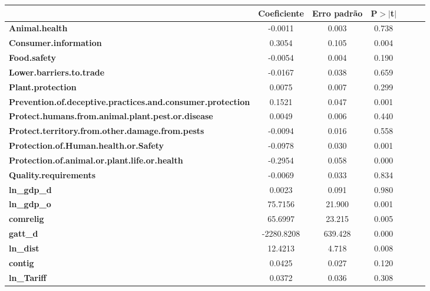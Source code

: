 \begin{center}
\begin{tabular}{lcccccc}
                                                                   & \textbf{Coeficiente} & \textbf{Erro padrão} & \textbf{P$> |$t$|$}\\
\midrule
\textbf{Animal.health}                                             &      -0.0011  &        0.003     &        0.738\\
\textbf{Consumer.information}                                      &       0.3054  &        0.105     &        0.004\\
\textbf{Food.safety}                                               &      -0.0054  &        0.004     &        0.190\\
\textbf{Lower.barriers.to.trade}                                   &      -0.0167  &        0.038     &        0.659\\
\textbf{Plant.protection}                                          &       0.0075  &        0.007     &        0.299\\
\textbf{Prevention.of.deceptive.practices.and.consumer.protection} &       0.1521  &        0.047     &        0.001\\
\textbf{Protect.humans.from.animal.plant.pest.or.disease}          &       0.0049  &        0.006     &        0.440\\
\textbf{Protect.territory.from.other.damage.from.pests}            &      -0.0094  &        0.016     &        0.558\\
\textbf{Protection.of.Human.health.or.Safety}                      &      -0.0978  &        0.030     &        0.001\\
\textbf{Protection.of.animal.or.plant.life.or.health}              &      -0.2954  &        0.058     &        0.000\\
\textbf{Quality.requirements}                                      &      -0.0069  &        0.033     &        0.834\\
\textbf{ln\_gdp\_d}                                                &       0.0023  &        0.091     &        0.980\\
\textbf{ln\_gdp\_o}                                                &      75.7156  &       21.900     &        0.001\\
\textbf{comrelig}                                                  &      65.6997  &       23.215     &        0.005\\
\textbf{gatt\_d}                                                   &   -2280.8208  &      639.428     &        0.000\\
\textbf{ln\_dist}                                                  &      12.4213  &        4.718     &        0.008\\
\textbf{contig}                                                    &       0.0425  &        0.027     &        0.120\\
\textbf{ln\_Tariff}                                                &       0.0372  &        0.036     &        0.308\\
\bottomrule
\end{tabular}
\end{center}